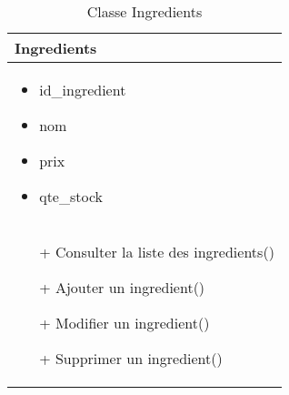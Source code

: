 \begin{table}[H]
    \begin{center}
        \begin{tabular}{|Z{5cm}|}
            \hline
            \textbf{Ingredients}\\
            \hline
            \begin{itemize}
                \item id\_ingredient
                \item nom
                \item prix
                \item qte\_stock
            \end{itemize}\\
            \hline
            \begin{itemize}
                \item[+] Consulter la liste des ingredients()
                \item[+] Ajouter un ingredient()
                \item[+] Modifier un ingredient()
                \item[+] Supprimer un ingredient()
            \end{itemize}
            \\
            \hline
        \end{tabular}	
        \caption{Classe Ingredients}
    \end{center}
\end{table}
